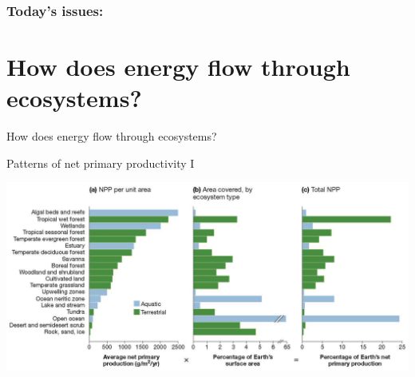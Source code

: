 \begin{noheadline}
\begin{frame}
\frametitle{Today's issues:}
\vspace{5mm}
\tableofcontents
\end{frame}
\end{noheadline}

\section{How does energy flow through ecosystems?}

\begin{frame}[t]
    \begin{adjustwidth}{-2em}{-1.5em}
        \vspace{-3mm}
        How does energy flow through ecosystems?

        \vspace{2mm}
        Patterns of net primary productivity I

        \includegraphics[width=\linewidth]{productivity-by-ecosystems.png}

    \end{adjustwidth}
\end{frame}

